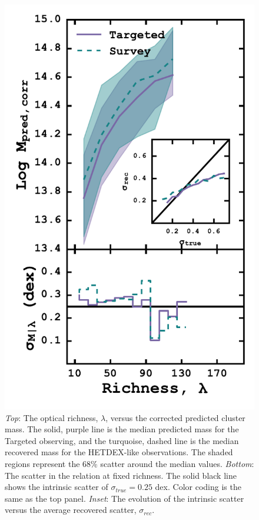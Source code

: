 \begin{figure}
	\begin{center}
		\includegraphics[height=0.75\textheight]{figures1/massRichness.pdf} 
	\end{center}
	\caption[Optical richness versus corrected cluster mass]{\emph{Top}: The optical richness, $\lambda$, versus the corrected predicted cluster mass. The solid, purple line is the median predicted mass for the Targeted observing, and the turquoise, dashed line is the median recovered mass for the HETDEX-like observations. The shaded regions represent the 68\% scatter around the median values. \emph{Bottom}: The scatter in the relation at fixed richness. The solid black line shows the intrinsic scatter of $\sigma_{true}=0.25$ dex. Color coding is the same as the top panel. \emph{Inset}: The evolution of the intrinsic scatter versus the average recovered scatter, $\sigma_{rec}$.}
	\label{fig:mass richness} 
\end{figure}

